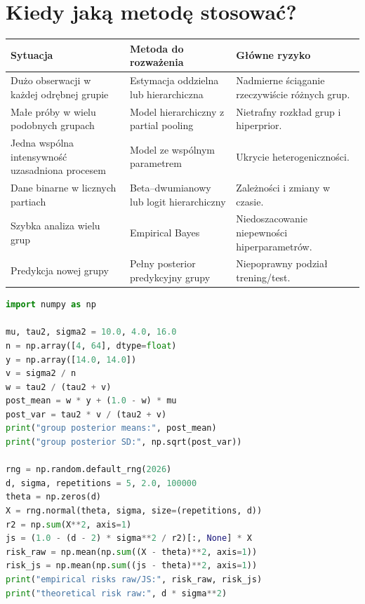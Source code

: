 \documentclass[11pt,a4paper,oneside]{report}
\numberwithin{equation}{chapter}
\theoremstyle{plain}
\theoremstyle{definition}
\theoremstyle{remark}
\begin{document}
\section{Kiedy jaką metodę stosować?}
\begin{center}\small
\begin{tabular}{>{\raggedright\arraybackslash}p{}>{\raggedright\arraybackslash}p{}>{\raggedright\arraybackslash}p{}}
\toprule
\textbf{Sytuacja} & \textbf{Metoda do rozważenia} & \textbf{Główne ryzyko}\\
\midrule
Dużo obserwacji w każdej odrębnej grupie & Estymacja oddzielna lub hierarchiczna & Nadmierne ściąganie rzeczywiście różnych grup.\\
Małe próby w wielu podobnych grupach & Model hierarchiczny z partial pooling & Nietrafny rozkład grup i hiperprior.\\
Jedna wspólna intensywność uzasadniona procesem & Model ze wspólnym parametrem & Ukrycie heterogeniczności.\\
Dane binarne w licznych partiach & Beta--dwumianowy lub logit hierarchiczny & Zależności i zmiany w czasie.\\
Szybka analiza wielu grup & Empirical Bayes & Niedoszacowanie niepewności hiperparametrów.\\
Predykcja nowej grupy & Pełny posterior predykcyjny grupy & Niepoprawny podział trening/test.\\
\bottomrule
\end{tabular}
\end{center}

\begin{lstlisting}[language=Python,caption={Kompletny program: partial pooling dla średnich grup i ryzyko Jamesa--Steina (Python, NumPy).}]
import numpy as np

mu, tau2, sigma2 = 10.0, 4.0, 16.0
n = np.array([4, 64], dtype=float)
y = np.array([14.0, 14.0])
v = sigma2 / n
w = tau2 / (tau2 + v)
post_mean = w * y + (1.0 - w) * mu
post_var = tau2 * v / (tau2 + v)
print("group posterior means:", post_mean)
print("group posterior SD:", np.sqrt(post_var))

rng = np.random.default_rng(2026)
d, sigma, repetitions = 5, 2.0, 100000
theta = np.zeros(d)
X = rng.normal(theta, sigma, size=(repetitions, d))
r2 = np.sum(X**2, axis=1)
js = (1.0 - (d - 2) * sigma**2 / r2)[:, None] * X
risk_raw = np.mean(np.sum((X - theta)**2, axis=1))
risk_js = np.mean(np.sum((js - theta)**2, axis=1))
print("empirical risks raw/JS:", risk_raw, risk_js)
print("theoretical risk raw:", d * sigma**2)
\end{lstlisting}
\end{document}
